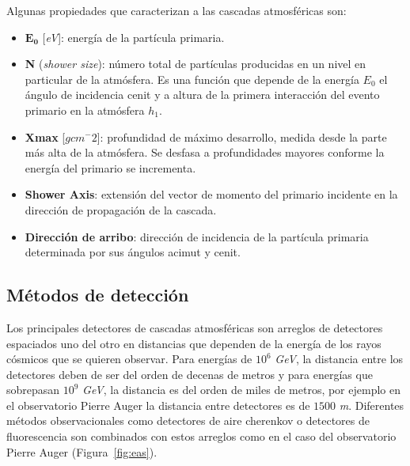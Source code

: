 Algunas propiedades que caracterizan a las cascadas atmosféricas son:

\begin{itemize}
    \item $\boldsymbol{E_0}$ [\textit{eV}]: energía de la partícula primaria. 
    \item \textbf{N} (\emph{shower size}): número total de partículas producidas en un nivel en particular de la atmósfera. Es una función que depende de la energía $E_0$ el ángulo de incidencia cenit y a altura de la primera interacción del evento primario en la atmósfera $h_1$.
    \item \textbf{Xmax} [$gcm^-2$]: profundidad de máximo desarrollo, medida desde la parte más alta de la atmósfera. Se desfasa a profundidades mayores conforme la energía del primario se incrementa.
    \item \textbf{Shower Axis}: extensión del vector de momento del primario incidente en la dirección de propagación de la cascada.
    \item \textbf{Dirección de arribo}: dirección de incidencia de la partícula primaria determinada por sus ángulos acimut y cenit.
\end{itemize}

\subsection{Métodos de detección}

Los principales detectores de cascadas atmosféricas son arreglos de detectores espaciados uno del otro en distancias que dependen de la energía de los rayos cósmicos que se quieren observar. Para energías de $10^6$ \textit{GeV}, la distancia entre los detectores deben de ser del orden de decenas de metros y para energías que sobrepasan $10^9$ \textit{GeV}, la distancia es del orden de miles de metros, por ejemplo en el observatorio Pierre Auger la distancia entre detectores es de $1500$ \textit{m}. Diferentes métodos observacionales como detectores de aire cherenkov o detectores de fluorescencia son combinados con estos arreglos como en el caso del observatorio Pierre Auger (Figura~\ref{fig:eas}).


